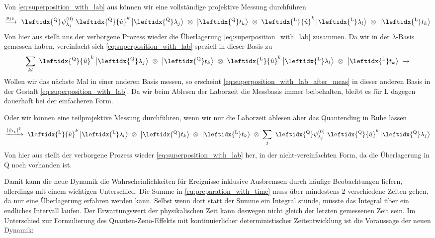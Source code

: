 \documentclass[12pt]{article}
\begin{document}
Von \eqref{eq:superposition_with_lab} aus können wir eine vollständige projektive Messung durchführen
\begin{equation}
\xrightarrow{p_{jk}}\ \leftidx{^\mathrm{Q}}\psi_{\lambda_j}^{(0)}\ 
\leftidx{^\mathrm{Q}}{\hat{u}}^k
\ket{\leftidx{^\mathrm{Q}}\lambda_j} 
\ \otimes\ \ket{\leftidx{^\mathrm{Q}}t_k}
\ \otimes\ \leftidx{^\mathrm{L}}{\hat{u}}^k \ket{ \leftidx{^\mathrm{L}}\lambda_l} 
\ \otimes\ \ket{\leftidx{^\mathrm{L}}t_k}
\end{equation}
Von hier aus stellt uns der verborgene Prozess wieder die Überlagerung \eqref{eq:superposition_with_lab} zusammen. Da wir in der $\lambda$-Basis gemessen haben, vereinfacht sich \eqref{eq:superposition_with_lab} speziell in dieser Basis zu 
\begin{equation}
\label{eq:superposition_with_lab_after_meas}
\sum_{kl}\ \leftidx{^\mathrm{Q}}{\hat{u}}^k
\ket{\leftidx{^\mathrm{Q}}\lambda_j} 
\ \otimes\ \ket{\leftidx{^\mathrm{Q}}t_k}
\ \otimes\ \leftidx{^\mathrm{L}}{\hat{u}}^k \ket{ \leftidx{^\mathrm{L}}\lambda_l} 
\ \otimes\ \ket{\leftidx{^\mathrm{L}}t_k}
\ \xrightarrow{}
\end{equation}
Wollen wir das nächste Mal in einer anderen Basis messen, so erscheint \eqref{eq:superposition_with_lab_after_meas} in dieser anderen Basis in der Gestalt \eqref{eq:superposition_with_lab}. Da wir beim Ablesen der Laborzeit die Messbasis immer beibehalten, bleibt es für L dagegen dauerhaft bei der einfacheren Form.

Oder wir können eine teilprojektive Messung durchführen, wenn wir nur die Laborzeit ablesen aber das Quantending in Ruhe lassen
\begin{equation}
\xrightarrow{|\psi_{t_k}|^2}\ 
\leftidx{^\mathrm{L}}{\hat{u}}^k \ket{ \leftidx{^\mathrm{L}}\lambda_l} 
\ \otimes\ \ket{\leftidx{^\mathrm{Q}}t_k}
\ \otimes\ \ket{\leftidx{^\mathrm{L}}t_k}
\ \otimes\ \sum_{j}\ \leftidx{^\mathrm{Q}}\psi_{\lambda_j}^{(0)}\ 
\leftidx{^\mathrm{Q}}{\hat{u}}^k
\ket{\leftidx{^\mathrm{Q}}\lambda_j} 
\end{equation}
Von hier aus stellt der verborgene Prozess wieder \eqref{eq:superposition_with_lab} her, in der nicht-vereinfachten Form, da die Überlagerung in Q noch vorhanden ist.

Damit kann die neue Dynamik die Wahrscheinlichkeiten für Ereignisse inklusive Ausbremsen durch häufige Beobachtungen liefern, allerdings mit einem wichtigen Unterschied. Die Summe in \eqref{eq:preparation_with_time} muss über mindestens 2 verschiedene Zeiten gehen, da nur eine Überlagerung erfahren werden kann. Selbst wenn dort statt der Summe ein Integral stünde, müsste das Integral über ein endliches Intervall laufen. Der Erwartungswert der physikalischen Zeit kann deswegen nicht gleich der letzten gemessenen Zeit sein. Im Unterschied zur Formulierung des Quanten-Zeno-Effekts mit kontinuierlicher deterministischer Zeitentwicklung ist die Voraussage der neuen Dynamik: 
\end{document}
